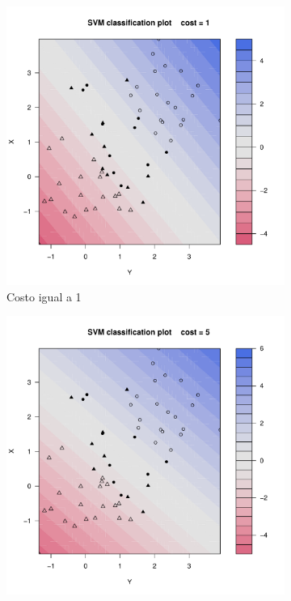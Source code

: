 \begin{figure}[H]
\begin{subfigure}{0.24\linewidth}
		\includegraphics[width=1\linewidth]{Graphics/Problema_01/Experiment_01_2.pdf}
		\caption{Costo igual a 1}
	\end{subfigure}
	\begin{subfigure}{0.24\linewidth}
		\includegraphics[width=1\linewidth]{Graphics/Problema_01/Experiment_01_3.pdf}

\end{subfigure}
\end{figure}
